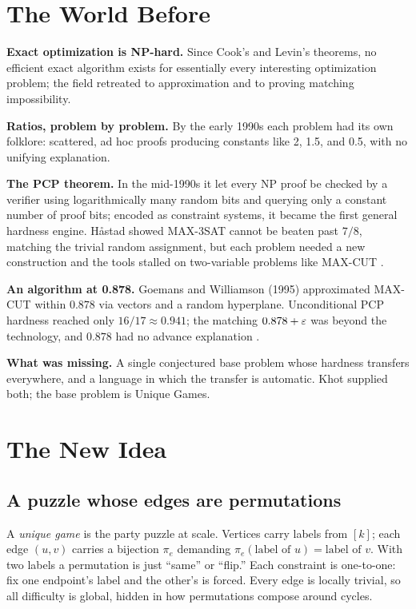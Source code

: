 \section{The World Before}
\noindent\textbf{Exact optimization is NP-hard.} Since Cook's and Levin's theorems, no efficient exact algorithm exists for essentially every interesting optimization problem; the field retreated to approximation and to proving matching impossibility.

\noindent\textbf{Ratios, problem by problem.} By the early 1990s each problem had its own folklore: scattered, ad hoc proofs producing constants like 2, 1.5, and 0.5, with no unifying explanation.

\noindent\textbf{The PCP theorem.} In the mid-1990s it let every NP proof be checked by a verifier using logarithmically many random bits and querying only a constant number of proof bits; encoded as constraint systems, it became the first general hardness engine. H\aa stad showed MAX-3SAT cannot be beaten past $7/8$, matching the trivial random assignment, but each problem needed a new construction and the tools stalled on two-variable problems like MAX-CUT \cite{hastad-optimal}.

\noindent\textbf{An algorithm at 0.878.} Goemans and Williamson (1995) approximated MAX-CUT within $0.878$ via vectors and a random hyperplane. Unconditional PCP hardness reached only $16/17\approx0.941$; the matching $0.878+\varepsilon$ was beyond the technology, and $0.878$ had no advance explanation \cite{goemans-williamson,hastad-optimal}.

\noindent\textbf{What was missing.} A single conjectured base problem whose hardness transfers everywhere, and a language in which the transfer is automatic. Khot supplied both; the base problem is Unique Games.

\section{The New Idea}
\subsection{A puzzle whose edges are permutations}
A \emph{unique game} is the party puzzle at scale. Vertices carry labels from $[k]$; each edge $(u,v)$ carries a bijection $\pi_e$ demanding $\pi_e(\text{label of }u)=\text{label of }v$. With two labels a permutation is just ``same'' or ``flip.'' Each constraint is one-to-one: fix one endpoint's label and the other's is forced. Every edge is locally trivial, so all difficulty is global, hidden in how permutations compose around cycles.

